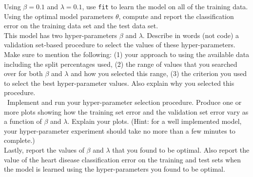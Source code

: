 \documentclass[11pt]{article}
\begin{document}
\begin{problem}{50}
 Using $\beta=0.1$ and $\lambda=0.1$, use \verb|fit| to learn the model on all of the training data. Using the optimal model parameters $\theta$, compute and report the classification error on the training data set and the test data set.\\

 This model has two hyper-parameters $\beta$ and $\lambda$. Describe in words (not code) a validation set-based procedure to select the values of these hyper-parameters. Make sure to mention the following: (1) your approach to using the available data including the split percentages used, (2) the range of values that you searched over for both $\beta$ and $\lambda$ and how you selected this range, (3) the criterion you used to select the best hyper-parameter values. Also explain why you selected this procedure.\\

 ~Implement and run your hyper-parameter selection procedure. Produce one or more plots showing how the training set error and the validation set error vary as a function of $\beta$ and $\lambda$. Explain your plots. (Hint: for a well implemented model, your hyper-parameter experiment should take no more than a few minutes to complete.)\\

 Lastly, report the values of $\beta$ and $\lambda$ that you found to be optimal. Also report the value of the heart disease classification error on the training and test sets when the model is learned using the hyper-parameters you found to be optimal. 
\end{problem}




\showpoints
\end{document}
